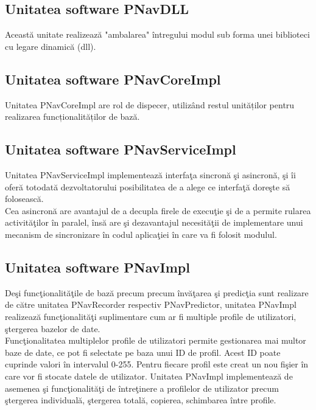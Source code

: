 \subsection{Unitatea software PNavDLL} 
Această unitate realizează "ambalarea" întregului modul sub forma unei biblioteci cu legare dinamică (\acrfull{dll}).

\subsection{Unitatea software PNavCoreImpl} 
Unitatea PNavCoreImpl are rol de dispecer, utilizând restul unităților pentru realizarea funcționalităților de bază. 

\subsection{Unitatea software PNavServiceImpl} 
Unitatea PNavServiceImpl implementează interfaţa sincronă şi asincronă, şi îi oferă totodată dezvoltatorului posibilitatea de a alege ce interfaţă doreşte să folosească.
\vspace{6pt}
\\Cea asincronă are avantajul de a decupla firele de execuţie şi de a permite rularea activităţilor în paralel, însă are şi dezavantajul necesităţii de implementare unui mecanism de sincronizare în codul aplicaţiei în care va fi folosit modulul.


\subsection{Unitatea software PNavImpl} 
Deşi funcţionalităţile de bază precum precum învăţarea şi predicţia sunt realizare de către unitatea PNavRecorder respectiv PNavPredictor, unitatea PNavImpl realizează funcţionalităţi suplimentare cum ar fi multiple profile de utilizatori, ştergerea bazelor de date.
\vspace{6pt}
\\Funcţionalitatea multiplelor profile de utilizatori permite gestionarea mai multor baze de date, ce pot fi selectate pe baza unui ID de profil.
Acest ID poate cuprinde valori în intervalul 0-255. Pentru fiecare profil este creat un nou fişier în care vor fi stocate datele de utilizator. Unitatea PNavImpl implementează de asemenea şi funcţionalităţi de întreţinere a profilelor de utilizator precum ştergerea individuală, ştergerea totală, copierea, schimbarea între profile.

